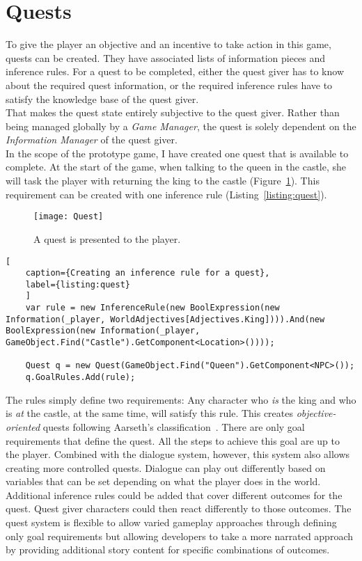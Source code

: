 \section{Quests}
To give the player an objective and an incentive to take action in this game, quests can be created. They have associated lists of information pieces and inference rules. For a quest to be completed, either the quest giver has to know about the required quest information, or the required inference rules have to satisfy the knowledge base of the quest giver.\\
That makes the quest state entirely subjective to the quest giver. Rather than being managed globally by a \textit{Game Manager}, the quest is solely dependent on the \textit{Information Manager} of the quest giver.\\
In the scope of the prototype game, I have created one quest that is available to complete. At the start of the game, when talking to the queen in the castle, she will task the player with returning the king to the castle (Figure~\ref{fig:quest}). This requirement can be created with one inference rule (Listing~\ref{listing:quest}).
\begin{figure}
	\centering
	\texttt{[image: Quest]}
	\caption{A quest is presented to the player.}
	\label{fig:quest}
\end{figure}
\begin{lstlisting}[
	caption={Creating an inference rule for a quest},
	label={listing:quest}
	]
	var rule = new InferenceRule(new BoolExpression(new Information(_player, WorldAdjectives[Adjectives.King]))).And(new BoolExpression(new Information(_player, GameObject.Find("Castle").GetComponent<Location>())));
	
	Quest q = new Quest(GameObject.Find("Queen").GetComponent<NPC>());
	q.GoalRules.Add(rule);
\end{lstlisting}
The rules simply define two requirements: Any character who \textit{is} the king and who is \textit{at} the castle, at the same time, will satisfy this rule. This creates \textit{objective-oriented} quests following Aarseth's classification~\cite{Aarseth2005}. There are only goal requirements that define the quest. All the steps to achieve this goal are up to the player. Combined with the dialogue system, however, this system also allows creating more controlled quests. Dialogue can play out differently based on variables that can be set depending on what the player does in the world. Additional inference rules could be added that cover different outcomes for the quest. Quest giver characters could then react differently to those outcomes. The quest system is flexible to allow varied gameplay approaches through defining only goal requirements but allowing developers to take a more narrated approach by providing additional story content for specific combinations of outcomes.
